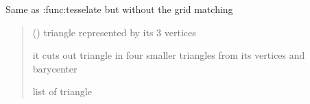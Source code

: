 \documentclass[letterpaper,10pt,english]{sphinxmanual}
\begin{document}
\begin{fulllineitems}
\label{\detokenize{reference:tesselator.tesselate2}}
\pysigstartsignatures
{}
\pysigstopsignatures
\sphinxAtStartPar
Same as :func:tesselate but without the grid matching
\begin{quote}\begin{description}
\sphinxAtStartPar
{} () \textendash{} triangle represented by its 3 vertices 

\sphinxAtStartPar
it cuts out triangle in four smaller triangles from its vertices and barycenter

\sphinxAtStartPar
list of triangle

\end{description}\end{quote}

\end{fulllineitems}

\end{document}
